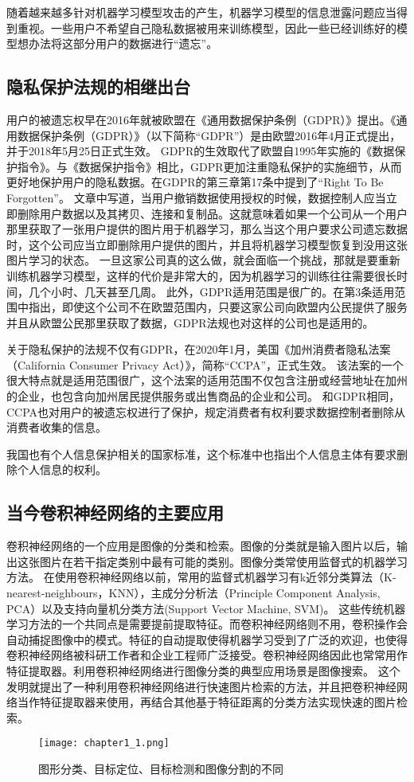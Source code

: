 随着越来越多针对机器学习模型攻击的产生，机器学习模型的信息泄露问题应当得到重视。一些用户不希望自己隐私数据被用来训练模型，因此一些已经训练好的模型想办法将这部分用户的数据进行“遗忘”。
\subsection{隐私保护法规的相继出台}
用户的被遗忘权早在2016年就被欧盟在《通用数据保护条例（GDPR）》提出。《通用数据保护条例（GDPR）》\cite{gdpr2018}（以下简称“GDPR”）是由欧盟2016年4月正式提出，并于2018年5月25日正式生效。
GDPR的生效取代了欧盟自1995年实施的《数据保护指令》。与《数据保护指令》相比，GDPR更加注重隐私保护的实施细节，从而更好地保护用户的隐私数据。在GDPR的第三章第17条中提到了“Right To Be Forgotten”。
文章中写道，当用户撤销数据使用授权的时候，数据控制人应当立即删除用户数据以及其拷贝、连接和复制品。这就意味着如果一个公司从一个用户那里获取了一张用户提供的图片用于机器学习，那么当这个用户要求公司遗忘数据时，这个公司应当立即删除用户提供的图片，并且将机器学习模型恢复到没用这张图片学习的状态。
一旦这家公司真的这么做，就会面临一个挑战，那就是要重新训练机器学习模型，这样的代价是非常大的，因为机器学习的训练往往需要很长时间，几个小时、几天甚至几周。
此外，GDPR适用范围是很广的。在第3条适用范围中指出，即使这个公司不在欧盟范围内，只要这家公司向欧盟内公民提供了服务并且从欧盟公民那里获取了数据，GDPR法规也对这样的公司也是适用的。

关于隐私保护的法规不仅有GDPR，在2020年1月，美国《加州消费者隐私法案（California Consumer Privacy Act）》\cite{ccpa2020}，简称“CCPA”，正式生效。
该法案的一个很大特点就是适用范围很广，这个法案的适用范围不仅包含注册或经营地址在加州的企业，也包含向加州居民提供服务或出售商品的企业和公司\cite{jiahui2020}。
和GDPR相同，CCPA也对用户的被遗忘权进行了保护，规定消费者有权利要求数据控制者删除从消费者收集的信息。

我国也有个人信息保护相关的国家标准\cite{gbt35273}，这个标准中也指出个人信息主体有要求删除个人信息的权利。

\subsection{当今卷积神经网络的主要应用}
卷积神经网络的一个应用是图像的分类和检索。图像的分类就是输入图片以后，输出这张图片在若干指定类别中最有可能的类别。图像分类常使用监督式的机器学习方法。
在使用卷积神经网络以前，常用的监督式机器学习有k近邻分类算法（K-nearest-neighbours，KNN），主成分分析法（Principle Component Analysis, PCA）以及支持向量机分类方法(Support Vector Machine, SVM)\cite{zhouzhihua2016}。
这些传统机器学习方法的一个共同点是需要提前提取特征。而卷积神经网络则不用，卷积操作会自动捕捉图像中的模式。特征的自动提取使得机器学习受到了广泛的欢迎，也使得卷积神经网络被科研工作者和企业工程师广泛接受。卷积神经网络因此也常常用作特征提取器。利用卷积神经网络进行图像分类的典型应用场景是图像搜索。
这个发明\cite{lingqiang2016}就提出了一种利用卷积神经网络进行快速图片检索的方法，并且把卷积神经网络当作特征提取器来使用，再结合其他基于特征距离的分类方法实现快速的图片检索。
\begin{figure}
  \centering
  \texttt{[image: chapter1\_1.png]}
  \caption{图形分类、目标定位、目标检测和图像分割的不同\cite{mubiaodingwei}}
  \label{fig:chapter1_1}
\end{figure}


